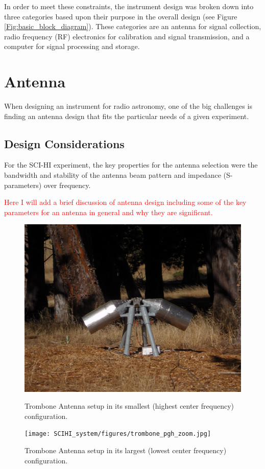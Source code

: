 In order to meet these constraints, the instrument design was broken down into three categories based upon their purpose in the overall design (see Figure \ref{Fig:basic_block_diagram}). These categories are an antenna for signal collection, radio frequency (RF) electronics for calibration and signal transmission, and a computer for signal processing and storage.

\section{Antenna}
When designing an instrument for radio astronomy, one of the big challenges is finding an antenna design that fits the particular needs of a given experiment. 

\subsection{Design Considerations}
For the SCI-HI experiment, the key properties for the antenna selection were the bandwidth and stability of the antenna beam pattern and impedance (S-parameters) over frequency. 

\textcolor{red}{Here I will add a brief discussion of antenna design including some of the key parameters for an antenna in general and why they are significant. }

\begin{figure}[htb]
\centering
\begin{minipage}[b]{0.45\textwidth}
\centering
\includegraphics[width=0.95\linewidth]{SCIHI_system/figures/trombone_guad_small.jpg}
\caption{Trombone Antenna setup in its smallest (highest center frequency) configuration.}
\label{Fig:trombone_small}
\end{minipage}%
\begin{minipage}[b]{0.02\textwidth}
\hspace{1cm}
\end{minipage}%
\begin{minipage}[b]{0.51\textwidth}
\centering
\texttt{[image: SCIHI\_system/figures/trombone\_pgh\_zoom.jpg]}
\caption{Trombone Antenna setup in its largest (lowest center frequency) configuration.}
\label{Fig:trombone_large}
\end{minipage}
\end{figure}

